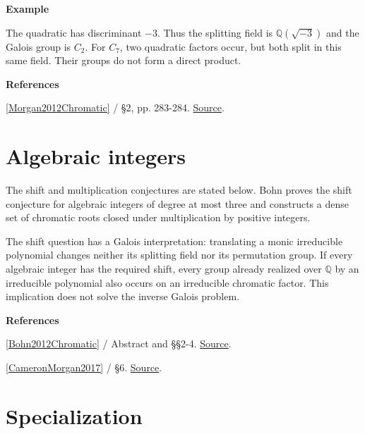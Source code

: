 \documentclass[11pt,a4paper,oneside,openany]{book}
\newcommand{\atlasdisplay}[1]{\par\begingroup\centering\vspace{3pt}\noindent\adjustbox{max width=\linewidth}{\(\displaystyle #1\)}\par\vspace{5pt}\endgroup}
\newenvironment{sources}{\par\smallskip\begingroup\footnotesize\color{atlasgray}\leftskip=10pt\setlength{\parskip}{2pt}}{\par\endgroup\smallskip}
\begin{document}
\begin{atlasblock}[standard]
\textbf{\sffamily Example}\par\smallskip

\atlasdisplay{P_{C_4}(q)=q(q-1)(q^2-3q+3).}
\color{black} The quadratic has discriminant \(-3\). Thus the splitting field is \(\mathbb Q(\sqrt{-3})\) and the Galois group is \(C_2\). For \(C_7\), two quadratic factors occur, but both split in this same field. Their groups do not form a direct product.\par
\end{atlasblock}\color{black}
\begin{sources}
\textbf{References}\par\smallskip
\noindent\hyperlink{ref:Morgan2012Chromatic}{[Morgan2012Chromatic]} / §2, pp. 283-284.  \href{https://doi.org/10.1112/S1461157012001052}{Source}.\par
\end{sources}\color{black}
\section{Algebraic integers}
\color{black} The shift and multiplication conjectures are stated below. Bohn proves the shift conjecture for algebraic integers of degree at most three and constructs a dense set of chromatic roots closed under multiplication by positive integers.\par
\color{black} The shift question has a Galois interpretation: translating a monic irreducible polynomial changes neither its splitting field nor its permutation group. If every algebraic integer has the required shift, every group already realized over \(\mathbb Q\) by an irreducible polynomial also occurs on an irreducible chromatic factor. This implication does not solve the inverse Galois problem.\par
\begin{sources}
\textbf{References}\par\smallskip
\noindent\hyperlink{ref:Bohn2012Chromatic}{[Bohn2012Chromatic]} / Abstract and §§2-4.  \href{https://doi.org/10.46298/dmtcs.3061}{Source}.\par
\noindent\hyperlink{ref:CameronMorgan2017}{[CameronMorgan2017]} / §6.  \href{https://doi.org/10.37236/6578}{Source}.\par
\end{sources}\color{black}
\section{Specialization}
\end{document}
